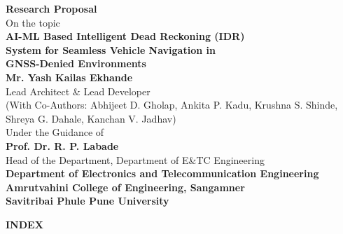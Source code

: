 \documentclass[11pt,a4paper]{article}
\begin{document}
\begin{center}
\vspace*{1.8cm}

{\LARGE \textbf{Research Proposal}}\\[0.4cm]
{\large On the topic}\\[2.0cm]

{\LARGE \textbf{AI-ML Based Intelligent Dead Reckoning (IDR)}}\\[0.25cm]
{\LARGE \textbf{System for Seamless Vehicle Navigation in}}\\[0.25cm]
{\LARGE \textbf{GNSS-Denied Environments}}\\[2.4cm]

{\large \textbf{Mr. Yash Kailas Ekhande}}\\[0.2cm]
{\normalsize Lead Architect \& Lead Developer}\\[0.1cm]
{\small (With Co-Authors: Abhijeet D. Gholap, Ankita P. Kadu, Krushna S. Shinde,}\\[0.05cm]
{\small Shreya G. Dahale, Kanchan V. Jadhav)}\\[1.8cm]

{\normalsize Under the Guidance of}\\[0.25cm]
{\large \textbf{Prof. Dr. R. P. Labade}}\\[0.1cm]
{\normalsize Head of the Department, Department of E\&TC Engineering}\\[2.4cm]

{\large \textbf{Department of Electronics and Telecommunication Engineering}}\\[0.15cm]
{\large \textbf{Amrutvahini College of Engineering, Sangamner}}\\[0.15cm]
{\large \textbf{Savitribai Phule Pune University}}

\vfill
\end{center}
\newpage

\begin{center}
\vspace*{0.4cm}
{\Large \textbf{INDEX}}\\[0.9cm]
\end{center}
\end{document}
